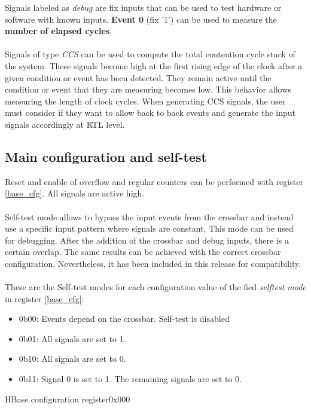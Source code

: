 Signals labeled as \textit{debug} are fix inputs that can be used to test hardware or software with known inputs. \textbf{Event 0} (fix '1') can be used to measure the \textbf{number of elapsed cycles}.\\
\\
Signals of type \textit{CCS} can be used to compute the total contention cycle stack of the system. These signals become high at the first rising edge of the clock after a given condition or event has been detected. They remain active until the condition or event that they are measuring becomes low. This behavior allows measuring the length of clock cycles. When generating CCS signals, the user must consider if they want to allow back to back events and generate the input signals accordingly at RTL level.

\subsection{Main configuration and self-test}
Reset and enable of overflow and regular counters can be performed with register \ref{base_cfg}. All signals are active high.\\
\\
Self-test mode allows to bypass the input events from the crossbar and instead use a specific input pattern where signals are constant. This mode can be used for debugging. After the addition of the crossbar and debug inputs, there is a certain overlap. The same results can be achieved with the correct crossbar configuration. Nevertheless, it has been included in this release for compatibility.\\
\\
These are the Self-test modes for each configuration value of the fied \textit{selftest mode} in register \ref{base_cfg}:
\begin{itemize}
	\item 0b00: Events depend on the crossbar. Self-test is disabled
	\item 0b01: All signals are set to 1.
	\item 0b10: All signals are set to 0.
	\item 0b11: Signal 0 is set to 1.  The remaining signals are set to 0.
\end{itemize}

 \begin{register}{H}{Base configuration register}{0x000}
   \label{base_cfg}
   \regnewline
  \end{register}

